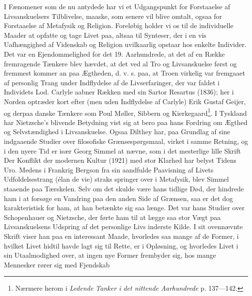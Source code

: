 \documentclass[12pt]{article}
\newcommand{\opage}[1]{\marginnote{\footnotesize\textit{[#1]}}}
\begin{document}
I Fænomener som de nu antydede har vi et Udgangspunkt for Forstaaelse
af Livsanskuelsers Tilblivelse, maaske, som senere vil blive omtalt,
ogsaa for Forstaaelse af Metafysik og Religion. Foreløbig holder vi os
til de individuelle Maader at opfatte og tage Livet paa, altsaa til
Synteser, der i en vis Uafhængighed af Videnskab og Religion
uvilkaarlig opstaar hos enkelte Individer. Det var en Ejendommelighed
for det 19. Aarhundrede, at det af en Række fremragende Tænkere blev
hævdet, at det ved al Tro og Livsanskuelse først og fremmest kommer an
paa Ægtheden, d. v. s. paa, at Troen virkelig var fremgaaet af
personlig Trang under Indflydelse af de Livserfaringer, der var faldet
i Individets Lod. Carlyle aabner Rækken med sin \guillemotright{}Sartor
Resartus\guillemotleft{} (1836); her i Norden optræder kort efter (men
uden Indflydelse af Carlyle) Erik Gustaf Geijer, og derpaa danske
Tænkere som Poul Møller, Sibbern og
Kierkegaard\footnote{Nærmere herom i \textit{Ledende Tanker i det
nittende Aarhundrede} p. 137---142.}. I Tyskland har Nietzsche's
blivende Betydning vist sig at bero paa hans Fordring om Ægthed og
Selvstændighed i Livsanskuelse. Ogsaa Dilthey har, paa Grundlag af
sine indgaaende Studier over filosofiske Grænsespørgsmaal, virket i
samme Retning, og i den nyere Tid er især Georg Simmel at nævne, som i
det mesterlige lille Skrift \guillemotright{}Der Konflikt der modernen
Kultur\guillemotleft{} (1921) med stor Klarhed har belyst Tidens Uro.
Medens i
\opage{50}Frankrig Bergson fra sin aandfulde Paavisning af Livets
Udfoldelsestrang (élan de vie) straks springer over i Metafysik, blev
Simmel staaende paa Tærskelen. Selv om det skulde være hans tidlige
Død, der hindrede ham i at forsøge en Vandring paa den anden Side af
Grænsen, saa er det dog karakteristisk for ham, at han betænkte sig saa
længe. Det var hans Studier over Schopenhauer og Nietzsche, der førte
ham til at lægge saa stor Vægt paa Livsanskuelsens Udspring af det
personlige Livs inderste Kilde. I sit ovennævnte Skrift viser han paa
en interessant Maade, hvorledes saa mange af de Former, i hvilket
Livet hidtil havde lagt sig til Rette, er i Opløsning, og hvorledes
Livet i sin Utaalmodighed over, at ingen nye Former frembyder sig, hos
mange Mennesker rører sig med Fjendskab
\end{document}
